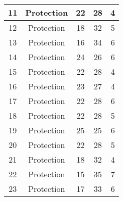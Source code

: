 \documentclass[results.tex]{subfiles}
\begin{document}
\begin{center}
\begin{tabular}{| c || c | c | c | c |}
            \hline
            11                      & Protection                   & 22                     & 28                      & 4                    \\
            \hline
            12                      & Protection                   & 18                     & 32                      & 5                    \\
            \hline
            13                      & Protection                   & 16                     & 34                      & 6                    \\
            \hline
            14                      & Protection                   & 24                     & 26                      & 6                    \\
            \hline
            15                      & Protection                   & 22                     & 28                      & 4                    \\
            \hline
            16                      & Protection                   & 23                     & 27                      & 4                    \\
            \hline
            17                      & Protection                   & 22                     & 28                      & 6                    \\
            \hline
            18                      & Protection                   & 22                     & 28                      & 5                    \\
            \hline
            19                      & Protection                   & 25                     & 25                      & 6                    \\
            \hline
            20                      & Protection                   & 22                     & 28                      & 5                    \\
            \hline
            21                      & Protection                   & 18                     & 32                      & 4                    \\
            \hline
            22                      & Protection                   & 15                     & 35                      & 7                    \\
            \hline
            23                      & Protection                   & 17                     & 33                      & 6                    \\

\end{tabular}
\end{center}
\end{document}
